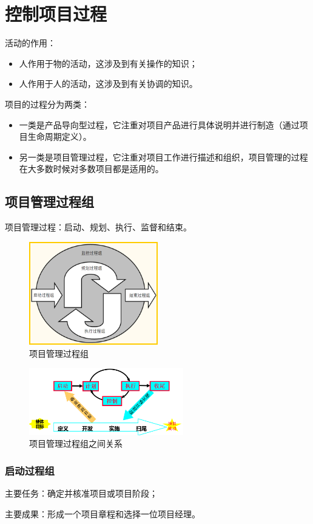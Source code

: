 \section{控制项目过程}
活动的作用：
\begin{itemize}
	\item 人作用于物的活动，这涉及到有关操作的知识；
	\item 人作用于人的活动，这涉及到有关协调的知识。
\end{itemize}
项目的过程分为两类：
\begin{itemize}
	\item 一类是产品导向型过程，它注重对项目产品进行具体说明并进行制造（通过项目生命周期定义）。
	\item 另一类是项目管理过程，它注重对项目工作进行描述和组织，项目管理的过程在大多数时候对多数项目都是适用的。
\end{itemize}
\subsection{项目管理过程组}
项目管理过程：启动、规划、执行、监督和结束。
\begin{figure}[!h]
	\centering
	\includegraphics[width=0.5\textwidth]{image/2-4}
	\caption{项目管理过程组}
\end{figure}
\begin{figure}[!h]
	\centering
	\includegraphics[width=0.6\textwidth]{image/2-5}
	\caption{项目管理过程组之间关系}
\end{figure}
\subsubsection*{启动过程组}
主要任务：确定并核准项目或项目阶段；
\par 主要成果：形成一个项目章程和选择一位项目经理。
